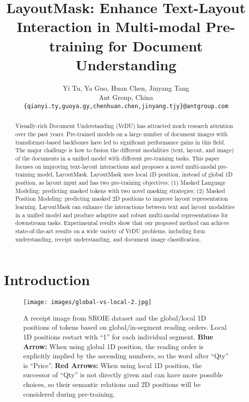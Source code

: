 \documentclass[11pt]{article}
\title{LayoutMask: Enhance Text-Layout Interaction in Multi-modal Pre-training for Document Understanding}
\author{Yi Tu, Ya Guo, Huan Chen, Jinyang Tang\\
  Ant Group, China \\
  \texttt{\{qianyi.ty,guoya.gy,chenhuan.chen,jinyang.tjy\}@antgroup.com} 
  }
\begin{document}
\maketitle
\begin{abstract}
Visually-rich Document Understanding (VrDU) has attracted much research attention over the past years.
Pre-trained models on a large number of document images with transformer-based backbones have led to significant performance gains in this field.
The major challenge is how to fusion the different modalities (text, layout, and image) of the documents in a unified model with different pre-training tasks. 
This paper focuses on improving text-layout interactions and proposes a novel multi-modal pre-training model, LayoutMask.
LayoutMask uses local 1D position, instead of global 1D position, as layout input and has two pre-training objectives: (1) Masked Language Modeling: predicting masked tokens with two novel masking strategies; (2) Masked Position Modeling: predicting masked 2D positions to improve layout representation learning.
LayoutMask can enhance the interactions between text and layout modalities in a unified model and produce adaptive and robust multi-modal representations for downstream tasks.
Experimental results show that our proposed method can achieve state-of-the-art results on a wide variety of VrDU problems, including form understanding, receipt understanding, and document image classification.
\end{abstract}

\section{Introduction}
\label{sec:intro}

\begin{figure}[t]
	\centering
	\texttt{[image: images/global-vs-local-2.jpg]}
	\caption{A receipt image from SROIE dataset and the global/local 1D positions of tokens based on global/in-segment reading orders. Local 1D positions restart with ``1'' for each individual segment.
	\textbf{Blue Arrow:} When using global 1D position, the  reading order is explicitly implied by the ascending numbers, so the word after ``Qty'' is ``Price''.
	\textbf{Red Arrows:} When using local 1D position, the successor of ``Qty'' is not directly given and can have more possible  choices, so their semantic relations and 2D positions will be considered during pre-training.}
	\label{fig:global-vs-local}
\end{figure}
\end{document}
